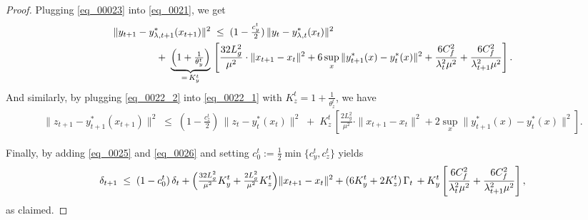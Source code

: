 \documentclass{uai2026} %
\begin{document}
\begin{proof}
Plugging \eqref{eq_00023} into \eqref{eq_0021}, we get
\begin{align}\label{eq_0025}
      \MoveEqLeft[4]\|y_{t+1}-y^{*}_{\lambda,t+1}(x_{t+1})\|^2\;\le\;
(1-\tfrac{c_y^{t}}{2})\,\|y_t-y^{*}_{\lambda,t}(x_t)\|^2\nonumber\\
&
\;+\;\underbrace{\Bigl(1+\tfrac{1}{\theta_y^{t}}\Bigr)}_{=\,K_y^{t}}\,
\left[ \frac{32L^{2}_{g}}{\mu^{2}}\cdot\|x_{t+1}-x_{t}\|^{2}+6\sup_{x}\|y^{*}_{t+1}(x)-y^{*}_{t}(x)\|^{2}+\frac{6C_{f}^{2}}{\lambda_{t}^{2}\mu^{2}}+\frac{6C_{f}^{2}}{\lambda_{t+1}^{2}\mu^{2}}\right].
\end{align}
And similarly, by plugging \eqref{eq_0022_2} into \eqref{eq_0022_1} with $K_z^{t}=1+\tfrac{1}{\theta_z^{t}}$, we have
\begin{align}\label{eq_0026}
    \|z_{t+1}-y^{*}_{t+1}(x_{t+1})\|^2
\;\le\;
(1-\tfrac{c_z^{t}}{2})\,\|z_t-y^{*}_t(x_t)\|^2
\;+\;K_z^{t}\,\left[\frac{2L^{2}_{g}}{\mu^{2}}\cdot\|x_{t+1}-x_{t}\|^{2}+2\sup_{x}\|y^{*}_{t+1}(x)-y^{*}_{t}(x)\|^{2}\right].
\end{align}

Finally, by adding \eqref{eq_0025} and \eqref{eq_0026} and setting
$c_0^{t}:=\tfrac12\min\{c_y^{t},c_z^{t}\}$ yields
\[
\delta_{t+1}
\;\le\;
(1-c_0^{t})\,\delta_t
+\Bigl(\tfrac{32L_g^2}{\mu^2}K_y^{t}+\tfrac{2L_g^2}{\mu^2}K_z^{t}\Bigr)\|x_{t+1}-x_t\|^2
+(6K_y^{t}+2K_z^{t})\,\Gamma_t\,+K_{y}^{t}\left[\frac{6C_{f}^{2}}{\lambda_{t}^{2}\mu^{2}}+\frac{6C_{f}^{2}}{\lambda_{t+1}^{2}\mu^{2}}\right],
\]
as claimed. 
\end{proof}
\end{document}
